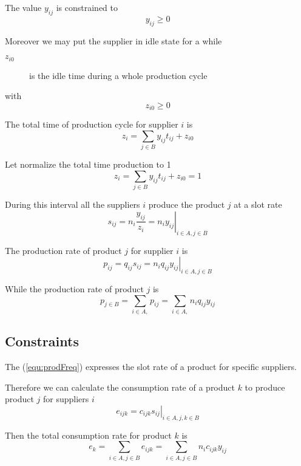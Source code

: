 \documentclass[a4paper,11pt]{article}
\begin{document}
The value $ y_{ij} $ is constrained to 
\begin{equation}
\label{equ:YConstraints}
	y_{ij} \ge 0
\end{equation}

Moreover we may put the supplier in idle state for a while
\begin{description}
	\item[$ z_{i0} $]
		is the idle time during a whole production cycle
\end{description}
with
\begin{equation}
\label{equ:ZConstraints}
	z_{i0} \ge 0
\end{equation}


The total time of production cycle for supplier $ i $ is
	\[ z_i = \sum_{j \in B} y_{ij} t_{ij} + z_{i0} \]

Let normalize the total time production to 1
\begin{equation}
\label{equ:normalInterval}
	z_i = \sum_{j \in B} y_{ij} t_{ij} + z_{i0} = 1
\end{equation}

During this interval all the suppliers $ i $ produce the product $ j $ at a slot rate
\begin{equation}
\label{equ:prodFreq}
\left.
	s_{ij} =  n_i \frac{y_{ij}}{z_i} = n_i y_{ij}
\right| _{i \in A, j \in B}
\end{equation}

The production rate of product $ j $ for supplier $ i $ is
\[
\left.
	p_{ij} = q_{ij} s_{ij} = n_i q_{ij} y_{ij}
\right| _{i \in A, j \in B}
\]

While the production rate of product $ j $ is
\begin{equation}
\label{equ:prodRate}
	p_{j \in B} = \sum_{i \in A,} p_{ij} = 
		\sum_{i \in A,} n_i q_{ij} y_{ij}
\end{equation}


\subsection{Constraints}

The (\ref{equ:prodFreq}) expresses the slot rate of a product for specific suppliers.

Therefore we can calculate the consumption rate of a product $k$ to produce product $ j $ for suppliers $ i $
\[
\left.
	e_{ijk}  = c_{ijk} s_{ij}
\right| _{i \in A, j,k \in B}
\]

Then the total consumption rate for product $ k $ is
\begin{equation}
\label{equ:consumRate}
	e_{k} = \sum_{i \in A, j \in B} e_{ijk}
	= \sum_{i \in A, j \in B} n_i c_{ijk} y_{ij}
\end{equation}
\end{document}
